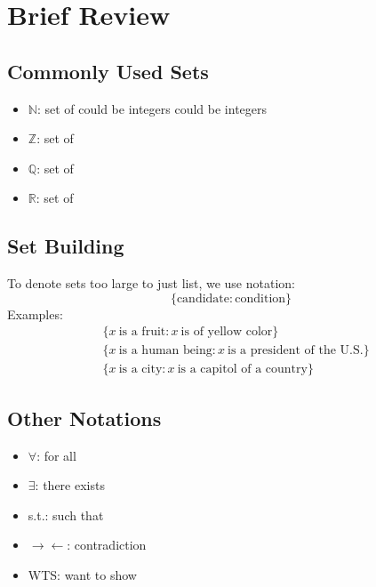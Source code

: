 \section{Brief Review}
\subsection*{Commonly Used Sets}
\begin{itemize}
  \item $\mathbb{N}$: set of 
        \subitem could be  integers
        \subitem could be  integers
  \item $\mathbb{Z}$: set of 
  \item $\mathbb{Q}$: set of 
  \item $\mathbb{R}$: set of 
\end{itemize}

\subsection*{Set Building}
To denote sets too large to just list, we use  notation:
\[
  \{\text{candidate}:\text{condition}\}
\]
Examples:
\begin{align*}
   & \{x~\text{is a fruit}: x~\text{is of yellow color}\}               \\
   & \{x~\text{is a human being}: x~\text{is a president of the U.S.}\} \\
   & \{x~\text{is a city}: x~\text{is a capitol of a country}\}
\end{align*}

\subsection*{Other Notations}
\begin{itemize}
  \item $\forall$: for all
  \item $\exists$: there exists
  \item s.t.: such that
  \item $\rightarrow \leftarrow$: contradiction
  \item WTS: want to show
\end{itemize}